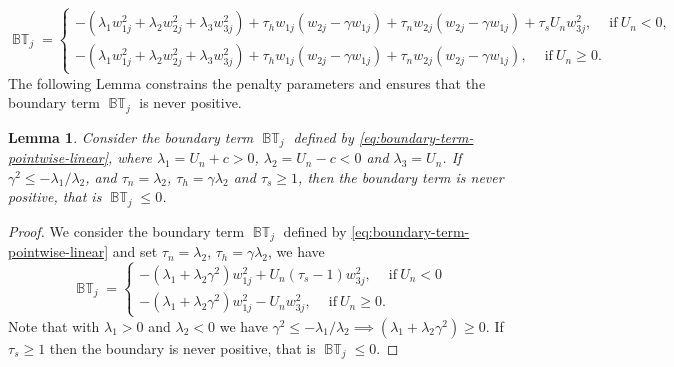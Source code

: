 \documentclass{article}
\numberwithin{equation}{section}
\newtheorem{lemma}{Lemma}
\theoremstyle{definition}
\begin{document}
{\small
\begin{equation}\label{eq:boundary-term-pointwise-linear}
    \operatorname{\mathbb{BT}}_j =
\begin{cases}
-\left(\lambda_1w_{1j}^2 + \lambda_2w_{2j}^2 + \lambda_3w_{3j}^2\right)+ \tau_h w_{1j} \left(w_{2j} - \gamma w_{1j}\right) +
     \tau_n w_{2j}\left(w_{2j} - \gamma w_{1j}\right) + \tau_s U_n w_{3j}^2, \quad \ \text{if} \ U_n < 0,\\
     
-\left(\lambda_1w_{1j}^2 + \lambda_2w_{2j}^2 + \lambda_3w_{3j}^2\right)+ \tau_h w_{1j} \left(w_{2j} - \gamma w_{1j}\right) +
     \tau_n w_{2j}\left(w_{2j} - \gamma w_{1j}\right) , \quad \ \text{if} \ U_n \ge  0.
     \end{cases}
\end{equation}
}
The following Lemma constrains the penalty parameters and ensures that the boundary term $\operatorname{\mathbb{BT}}_j$  is never positive.
\begin{lemma}\label{lem:boundary-term-pointwise-linear}
    Consider the boundary term  $\operatorname{\mathbb{BT}}_j$ defined by \eqref{eq:boundary-term-pointwise-linear}, where $\lambda_1 = U_n + c >0$, $\lambda_2 = U_n-c < 0$ and $\lambda_3 = U_n$. If $\gamma^2 \le -\lambda_1/\lambda_2$, and $\tau_n =\lambda_2$, $\tau_h = \gamma \lambda_2$ and $\tau_s \ge 1$,  then the boundary term is never positive, that is $\operatorname{\mathbb{BT}}_j \le 0$.
\end{lemma}
\begin{proof}
    We consider the boundary term  $\operatorname{\mathbb{BT}}_j$ defined by \eqref{eq:boundary-term-pointwise-linear} and set $\tau_n =\lambda_2$, $\tau_h = \gamma \lambda_2$, we have
  \begin{equation*}
    \operatorname{\mathbb{BT}}_j =
\begin{cases}
-\left(\lambda_1 + \lambda_2 \gamma^2\right)w_{1j}^2 +  U_n (\tau_s-1) w_{3j}^2, \quad \ \text{if} \ U_n < 0\\
     
-\left(\lambda_1 + \lambda_2 \gamma^2\right)w_{1j}^2  - U_n w_{3j}^2
      , \quad \ \text{if} \ U_n \ge  0.
     \end{cases}
\end{equation*}  
Note that with $\lambda_1 > 0$ and $\lambda_2 < 0$ we have  $\gamma^2 \le -\lambda_1/\lambda_2 \implies \left(\lambda_1 + \lambda_2 \gamma^2\right) \ge 0$. If $\tau_s \ge 1$  then the boundary is never positive, that is $\operatorname{\mathbb{BT}}_j \le 0$.
\end{proof}
\end{document}
